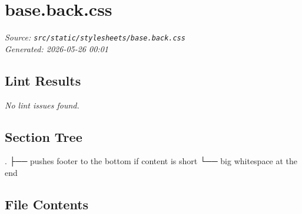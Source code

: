 
\section{base.back.css}
\textit{Source: \texttt{src/static/stylesheets/base.back.css}} \\
\textit{Generated: 2026-05-26 00:01} \\

\subsection{Lint Results}
\textit{No lint issues found.} \\

\subsection{Section Tree}
\begingroup
\linespread{0.9}\selectfont
\begin{verbnobox}[\FiraCode]
.
├── pushes footer to the bottom if content is short
└── big whitespace at the end
\end{verbnobox}
\endgroup

\subsection{File Contents}
\newpage
